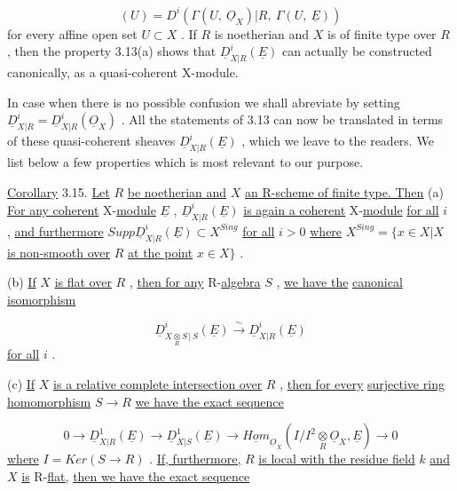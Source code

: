 \begin{equation*}
[\underline{D}^i_{X|R}(\underline{E})](U) = D^i(\Gamma(U,\ \underline{O}_X)|R,\ \Gamma(U,\ \underline{E}))
\end{equation*}
for every affine open set  $U \subset X$  . If  $R$  is noetherian and  $X$  is of finite type over  $R$  , then the property 3.13(a) shows that  $\underline{D}^i_{X|R}(\underline{E})$  can actually be constructed canonically, as a quasi-coherent X-module.

        In case when there is no possible confusion we shall abreviate by setting  $\underline{D}^i_{X|R} = \underline{D}^i_{X|R}(\underline{O}_X)$  . All the statements of 3.13 can now be translated in terms of these quasi-coherent sheaves  $\underline{D}^i_{X|R}(\underline{E})$  , which we leave to the readers. We list below a few properties which is most relevant to our purpose.

\underline{Corollary} 3.15. \underline{Let}  $R$  \underline{be noetherian and}  $X$  \underline{an R-scheme of finite type. Then}
(a)  \underline{For any coherent} X-\underline{module}  $\underline{E}$ , $\underline{D}^i_{X|R}(\underline{E})$  \underline{is again a coherent} X-\underline{module} \underline{for all}  $i$ , \underline{and furthermore}  $Supp \underline{D}^i_{X|R}(\underline{E}) \subset X^{Sing}$  \underline{for all}  $i > 0$  \underline{where} $X^{Sing} = \{x \in X| X$ \underline{is non-smooth over}  $R$  \underline{at the point}  $x \in X\}$ .

(b)  \underline{If}  $X$  \underline{is flat over}  $R$ , \underline{then for any} R-\underline{algebra}  $S$ , \underline{we have the} \underline{canonical isomorphism}

\begin{equation*}
\underline{D}^i_{X\underset{R}{\otimes}S\,|\,S}(\underline{E}) \overset{\sim}{\to} \underline{D}^i_{X|R}(\underline{E})
\end{equation*}
\underline{for all}  $i$ .

(c)  \underline{If}  $X$  \underline{is a relative complete intersection over}  $R$ , \underline{then for every} \underline{surjective ring homomorphism}  $S \to R$  \underline{we have the exact sequence}

\begin{equation*}
0 \to \underline{D}^1_{X|R}(\underline{E}) \to \underline{D}^1_{X|S}(\underline{E}) \to \underline{Hom}_{\underline{O}_X}(I/I^2\underset{R}{\otimes}\underline{O}_X, \underline{E}) \to 0
\end{equation*}
\underline{where}  $I = Ker(S \to R)$ . \underline{If, furthermore,}  $R$  \underline{is local with the residue field}  $k$ \underline{and}  $X$  \underline{is} R-\underline{flat,} \underline{then we have the exact sequence}

